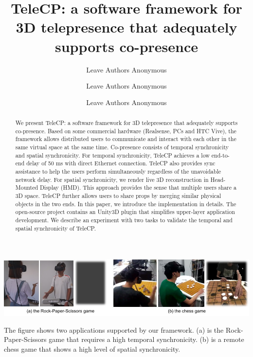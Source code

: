 \documentclass[sigchi, review]{acmart}
\begin{document}
\begin{CJK*}{UTF8}{gbsn}

\title{TeleCP: a software framework for 3D telepresence that adequately supports co-presence}


\author{Leave Authors Anonymous}

\author{Leave Authors Anonymous}

\author{Leave Authors Anonymous}

\renewcommand{\shortauthors}{B. Trovato et al.}


\begin{teaserfigure}
\centering
\includegraphics[width=\textwidth]{figures/figure_teaser.jpg}
\caption{The figure shows two applications supported by our framework. (a) is the Rock-Paper-Scissors game that requires a high temporal synchronicity. (b) is a remote chess game that shows a high level of spatial synchronicity.}
\label{fig:teaser}
\end{teaserfigure}

\begin{abstract}

We present TeleCP: a software framework for 3D telepresence that adequately supports co-presence. Based on some commercial hardware (Realsense, PCs and HTC Vive), the framework allows distributed users to communicate and interact with each other in the same virtual space at the same time. Co-presence consists of temporal synchronicity and spatial synchronicity. For temporal synchronicity, TeleCP achieves a low end-to-end delay of 50 ms with direct Ethernet connection. TeleCP also provides sync assistance to help the users perform simultaneously regardless of the unavoidable network delay. For spatial synchronicity, we render live 3D reconstruction in Head-Mounted Display (HMD). This approach provides the sense that multiple users share a 3D space. TeleCP further allows users to share props by merging similar physical objects in the two ends. In this paper, we introduce the implementation in details. The open-source project contains an Unity3D plugin that simplifies upper-layer application development. We describe an experiment with two tasks to validate the temporal and spatial synchronicity of TeleCP.


\end{abstract}
\end{CJK*}
\end{document}
